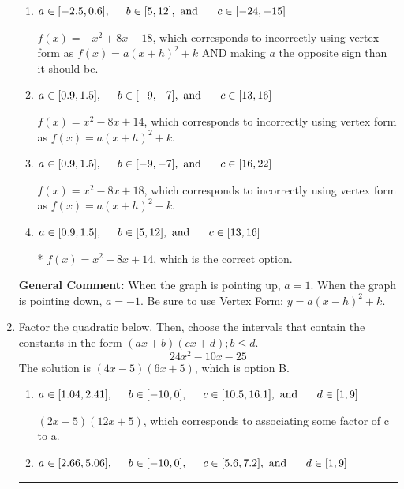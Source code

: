 \documentclass{extbook}[14pt]
\newcommand{\litem}[1]{\item #1

\rule{\textwidth}{0.4pt}}
\begin{document}
\begin{enumerate}
{\begin{enumerate}[label=\Alph*.]
$f(x)=-x^{2} -8 x -18$, which corresponds to making $a$ the opposite sign than it should be.
\item \( a \in [-2.5, 0.6], \hspace*{5mm} b \in [5, 12], \text{ and } \hspace*{5mm} c \in [-24, -15] \)

$f(x)=-x^{2} +8 x -18$, which corresponds to incorrectly using vertex form as $f(x) = a(x+h)^2+k$ AND making $a$ the opposite sign than it should be.
\item \( a \in [0.9, 1.5], \hspace*{5mm} b \in [-9, -7], \text{ and } \hspace*{5mm} c \in [13, 16] \)

$f(x)=x^{2} -8 x + 14$, which corresponds to incorrectly using vertex form as $f(x) = a(x+h)^2+k$.
\item \( a \in [0.9, 1.5], \hspace*{5mm} b \in [-9, -7], \text{ and } \hspace*{5mm} c \in [16, 22] \)

$f(x)=x^{2} -8 x + 18$, which corresponds to incorrectly using vertex form as $f(x) = a(x+h)^2 - k$.
\item \( a \in [0.9, 1.5], \hspace*{5mm} b \in [5, 12], \text{ and } \hspace*{5mm} c \in [13, 16] \)

* $f(x)=x^{2} +8 x + 14$, which is the correct option.
\end{enumerate}

\textbf{General Comment:} When the graph is pointing up, $a=1$. When the graph is pointing down, $a=-1$. Be sure to use Vertex Form: $y = a(x-h)^2+k$.
}
\litem{
Factor the quadratic below. Then, choose the intervals that contain the constants in the form $(ax+b)(cx+d); b \leq d.$
\[ 24x^{2} -10 x -25 \]The solution is \( (4x -5)(6x + 5) \), which is option B.\begin{enumerate}[label=\Alph*.]
\item \( a \in [1.04, 2.41], \hspace*{5mm} b \in [-10, 0], \hspace*{5mm} c \in [10.5, 16.1], \text{ and } \hspace*{5mm} d \in [1, 9] \)

 $(2x -5)(12x + 5)$, which corresponds to associating some factor of c to a.
\item \( a \in [2.66, 5.06], \hspace*{5mm} b \in [-10, 0], \hspace*{5mm} c \in [5.6, 7.2], \text{ and } \hspace*{5mm} d \in [1, 9] \)


\end{enumerate}}
\end{enumerate}
\end{document}
